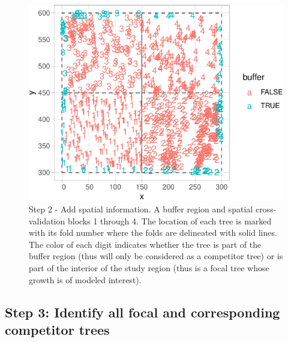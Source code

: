 \documentclass[12pt]{article}
\newenvironment{Shaded}{\begin{snugshade}}{\end{snugshade}}
\newcommand{\DataTypeTok}[1]{\textcolor[rgb]{0.13,0.29,0.53}{#1}}
\newcommand{\DecValTok}[1]{\textcolor[rgb]{0.00,0.00,0.81}{#1}}
\newcommand{\KeywordTok}[1]{\textcolor[rgb]{0.13,0.29,0.53}{\textbf{#1}}}
\newcommand{\NormalTok}[1]{#1}
\newcommand{\OperatorTok}[1]{\textcolor[rgb]{0.81,0.36,0.00}{\textbf{#1}}}
\newcommand{\StringTok}[1]{\textcolor[rgb]{0.31,0.60,0.02}{#1}}
\begin{document}
\begin{Shaded}
\end{Shaded}

\begin{figure}

{\centering \includegraphics[width=0.66\linewidth]{Figures/scbi-spatial-information-1} 

}

\caption{Step 2 - Add spatial information. A buffer region and spatial cross-validation blocks 1 through 4. The location of each tree is marked with its fold number where the folds are delineated with solid lines. The color of each digit indicates whether the tree is part of the buffer region (thus will only be considered as a competitor tree) or is part of the interior of the study region (thus is a focal tree whose growth is of modeled interest).}\label{fig:scbi-spatial-information}
\end{figure}

\hypertarget{focal-vs-comp}{%
\subsection{Step 3: Identify all focal and corresponding competitor
trees}\label{focal-vs-comp}}
\end{document}
